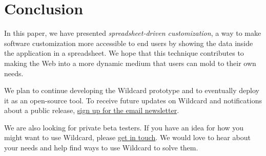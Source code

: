 \documentclass[english,submission]{programming}
\begin{document}
\hypertarget{conclusion}{%
\section{Conclusion}\label{conclusion}}

In this paper, we have presented \emph{spreadsheet-driven
customization}, a way to make software customization more accessible to
end users by showing the data inside the application in a spreadsheet.
We hope that this technique contributes to making the Web into a more
dynamic medium that users can mold to their own needs.

We plan to continue developing the Wildcard prototype and to eventually
deploy it as an open-source tool. To receive future updates on Wildcard
and notifications about a public release, \href{}{sign up for the email
newsletter}.

We are also looking for private beta testers. If you have an idea for
how you might want to use Wildcard, please
\href{mailto:glitt@mit.edu}{get in touch}. We would love to hear about
your needs and help find ways to use Wildcard to solve them.

\acks
\printbibliography
\end{document}
